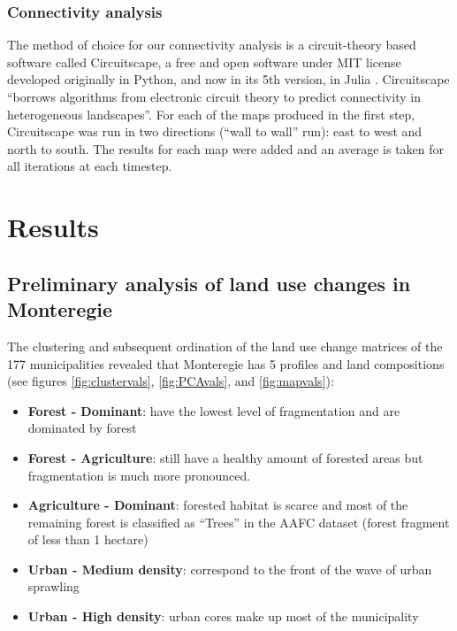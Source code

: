 \subsubsection{Connectivity analysis}
The method of choice for our connectivity analysis is a circuit-theory based software called Circuitscape, a free and open software under MIT license developed originally in Python, and now in its 5th version, in Julia \citep{circuitjulia}.  Circuitscape “borrows algorithms from electronic circuit theory to predict connectivity in heterogeneous landscapes”.
For each of the maps produced in the first step, Circuitscape was run in two directions (“wall to wall” run): east to west and north to south. The results for each map were added and an average is taken for all iterations at each timestep.\\


\section{Results}

\subsection{Preliminary analysis of land use changes in Monteregie}
The clustering and subsequent ordination of the land use change matrices of the 177 municipalities revealed that Monteregie has 5 profiles and land compositions (see figures \ref{fig:clustervals}, \ref{fig:PCAvals}, and \ref{fig:mapvals}):
\begin{itemize}
  \item \textbf{Forest - Dominant}: have the lowest level of fragmentation and are dominated by forest
  \item \textbf{Forest - Agriculture}: still have a healthy amount of forested areas but fragmentation is much more pronounced.
  \item \textbf{Agriculture - Dominant}: forested habitat is scarce and most of the remaining forest is classified as “Trees” in the AAFC dataset (forest fragment of less than 1 hectare)
  \item \textbf{Urban - Medium density}: correspond to the front of the wave of urban sprawling
  \item \textbf{Urban - High density}: urban cores make up most of the municipality\\
\end{itemize} 

